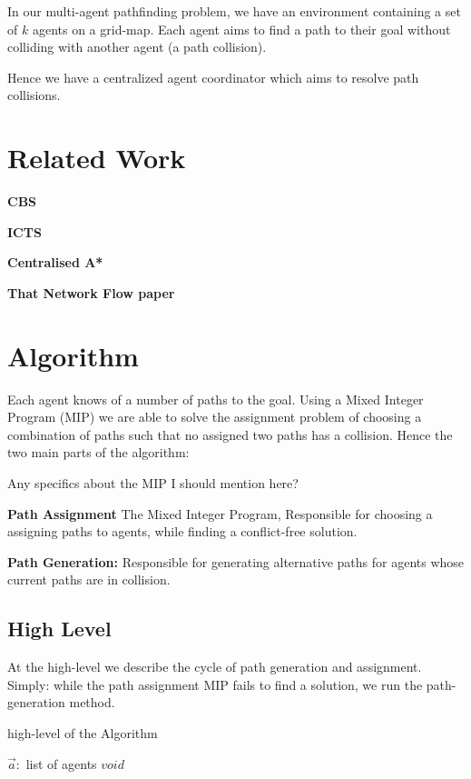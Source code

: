 \documentclass[a4paper,11pt]{article}
\begin{document}
In our multi-agent pathfinding problem, we have an environment containing a set of $k$ agents on a grid-map. Each agent aims to find a path to their goal without colliding with another agent (a path collision).

Hence we have a centralized agent coordinator which aims to resolve path collisions.

\section{Related Work}
\textbf{CBS}

\textbf{ICTS}

\textbf{Centralised A*}

\textbf{That Network Flow paper}

\section{Algorithm}
Each agent knows of a number of paths to the goal. Using a Mixed Integer Program (MIP) we are able to solve the assignment problem of choosing a combination of paths such that no assigned two paths has a collision. Hence the two main parts of the algorithm:

Any specifics about the MIP I should mention here? 

\begin{compactenum}
	\item \textbf{Path Assignment} The Mixed Integer Program, Responsible for choosing a assigning paths to agents, while finding a conflict-free solution.
	\item \textbf{Path Generation:} Responsible for generating alternative paths for agents whose current paths are in collision.
\end{compactenum}

\subsection{High Level} \label{sec:high-level}
At the high-level we describe the cycle of path generation and assignment. Simply: while the path assignment MIP fails to find a solution, we run the path-generation method.

\begin{algorithm}
	\caption{high-level of the Algorithm} \label{alg:agent-coordinator}
	\begin{algorithmic}[1]
		\Require $\vec{a}:$ list of agents
		\Ensure $void$
		\Do
	\end{algorithmic}
\end{algorithm}
\end{document}
